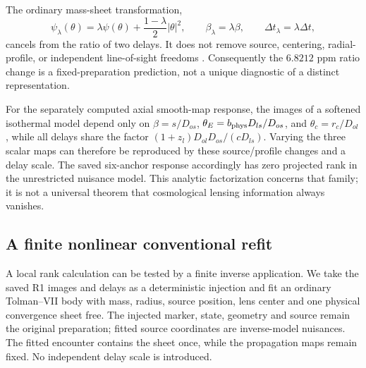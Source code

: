 The ordinary mass-sheet transformation,
\begin{equation}
 \psi_\lambda(\theta)=\lambda\psi(\theta)
       +\frac{1-\lambda}{2}|\theta|^2,\qquad
 \beta_\lambda=\lambda\beta,\qquad
 \Delta t_\lambda=\lambda\Delta t ,
 \label{eq:mst}
\end{equation}
cancels from the ratio of two delays. It does not remove source,
centering, radial-profile, or independent line-of-sight freedoms
\citep{Teodori2022}. Consequently the $6.8212$ ppm ratio change is a
fixed-preparation prediction, not a unique diagnostic of a distinct representation.

For the separately computed axial smooth-map response, the images of a
softened isothermal model depend only on
$\beta=s/D_{os}$, $\theta_E=b_{\rm phys}D_{ls}/D_{os}$, and
$\theta_c=r_c/D_{ol}$, while all delays share the factor
$(1+z_l)D_{ol}D_{os}/(cD_{ls})$. Varying the three scalar maps can therefore
be reproduced by these source/profile changes and a delay scale.
The saved six-anchor response accordingly has zero projected rank in
the unrestricted nuisance model. This analytic factorization concerns
that family; it is not a universal theorem that cosmological lensing
information always vanishes.

\subsection{A finite nonlinear conventional refit}
\label{sec:nonlinear-refit}
A local rank calculation can be tested by a finite inverse application.
We take the saved R1 images and delays as a deterministic injection and
fit an ordinary Tolman--VII body with mass, radius, source position,
lens center and one physical convergence sheet free. The injected
marker, state, geometry and source remain the original preparation;
fitted source coordinates are inverse-model nuisances. The fitted
encounter contains the sheet once, while the propagation maps remain
fixed. No independent delay scale is introduced.

